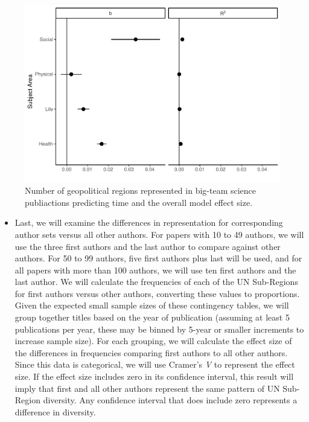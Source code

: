 \documentclass[
  man]{apa7}
\providecommand{\tightlist}{%
  \setlength{\itemsep}{0pt}\setlength{\parskip}{0pt}}
\begin{document}
\begin{figure}
\centering
\includegraphics{manuscript_scopus_files/figure-latex/fig-diversity-1.pdf}
\caption{\label{fig:fig-diversity}Number of geopolitical regions represented in big-team science publiactions predicting time and the overall model effect size.}
\end{figure}

\begin{itemize}
\tightlist
\item
  Last, we will examine the differences in representation for
  corresponding author sets versus all other authors. For papers with
  10 to 49 authors, we will use the three first authors and the last
  author to compare against other authors. For 50 to 99 authors, five
  first authors plus last will be used, and for all papers with more
  than 100 authors, we will use ten first authors and the last author.
  We will calculate the frequencies of each of the UN Sub-Regions for
  first authors versus other authors, converting these values to
  proportions. Given the expected small sample sizes of these
  contingency tables, we will group together titles based on the year
  of publication (assuming at least 5 publications per year, these may
  be binned by 5-year or smaller increments to increase sample size).
  For each grouping, we will calculate the effect size of the
  differences in frequencies comparing first authors to all other
  authors. Since this data is categorical, we will use Cramer's \emph{V} to
  represent the effect size. If the effect size includes zero in its
  confidence interval, this result will imply that first and all other
  authors represent the same pattern of UN Sub-Region diversity. Any
  confidence interval that does include zero represents a difference
  in diversity.
\end{itemize}
\end{document}
